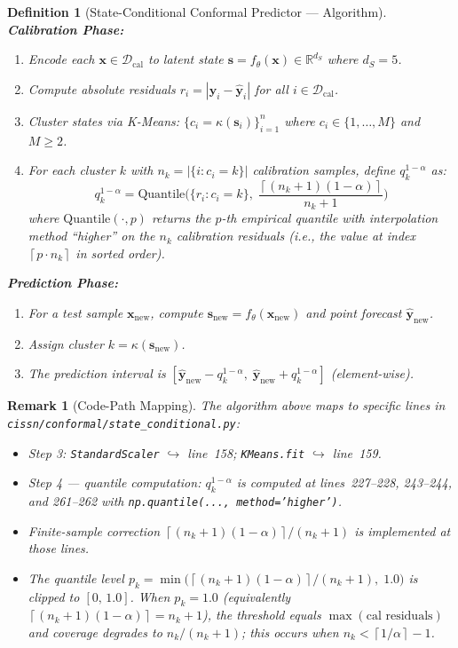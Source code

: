\documentclass[11pt]{article}
\newtheorem{definition}[theorem]{Definition}
\newtheorem{remark}[theorem]{Remark}
\newcommand{\R}{\mathbb{R}}
\newcommand{\cD}{\mathcal{D}}
\newcommand{\ceil}[1]{\left\lceil #1 \right\rceil}
\begin{document}
\begin{definition}[State-Conditional Conformal Predictor — Algorithm]\label{def:algo}
\textbf{Calibration Phase:}
\begin{enumerate}
    \item Encode each $\mathbf{x} \in \cD_{\text{cal}}$ to latent state $\mathbf{s} = f_\theta(\mathbf{x}) \in \R^{d_S}$ where $d_S = 5$.
    \item Compute absolute residuals $r_i = |\mathbf{y}_i - \hat{\mathbf{y}}_i|$ for all $i \in \cD_{\text{cal}}$.
    \item Cluster states via K-Means: $\{c_i = \kappa(\mathbf{s}_i)\}_{i=1}^{n}$ where $c_i \in \{1,\dots,M\}$ and $M \geq 2$.
    \item For each cluster $k$ with $n_k = |\{i \colon c_i = k\}|$ calibration samples, define $q_k^{1-\alpha}$ as:
    \[
    q_k^{1-\alpha} = \text{Quantile}\Big(\{r_i \colon c_i = k\},\; \frac{\ceil{(n_k+1)(1-\alpha)}}{n_k + 1}\Big)
    \]
    where $\text{Quantile}(\cdot, p)$ returns the $p$-th empirical quantile with interpolation method ``higher'' on the $n_k$ calibration residuals (i.e., the value at index $\ceil{p \cdot n_k}$ in sorted order).
\end{enumerate}

\textbf{Prediction Phase:}
\begin{enumerate}
    \item For a test sample $\mathbf{x}_{\text{new}}$, compute $\mathbf{s}_{\text{new}} = f_\theta(\mathbf{x}_{\text{new}})$ and point forecast $\hat{\mathbf{y}}_{\text{new}}$.
    \item Assign cluster $k = \kappa(\mathbf{s}_{\text{new}})$.
    \item The prediction interval is $[\hat{\mathbf{y}}_{\text{new}} - q_k^{1-\alpha},\; \hat{\mathbf{y}}_{\text{new}} + q_k^{1-\alpha}]$ (element-wise).
\end{enumerate}
\end{definition}

\begin{remark}[Code-Path Mapping]
The algorithm above maps to specific lines in \texttt{cissn/conformal/state\_conditional.py}:
\begin{itemize}
    \item Step 3: \texttt{StandardScaler} $\hookrightarrow$ line~158; \texttt{KMeans.fit} $\hookrightarrow$ line~159.
    \item Step 4 — quantile computation: $q_k^{1-\alpha}$ is computed at lines~227--228, 243--244, and 261--262 with \texttt{np.quantile(..., method='higher')}.
    \item Finite-sample correction $\ceil{(n_k+1)(1-\alpha)}/(n_k+1)$ is implemented at those lines.
    \item The quantile level $p_k = \min\big(\ceil{(n_k+1)(1-\alpha)}/(n_k+1),\; 1.0\big)$ is clipped to $[0,\,1.0]$. When $p_k = 1.0$ (equivalently $\ceil{(n_k+1)(1-\alpha)} = n_k+1$), the threshold equals $\max(\text{cal residuals})$ and coverage degrades to $n_k/(n_k+1)$; this occurs when $n_k < \ceil{1/\alpha} - 1$.
\end{itemize}
\end{remark}
\end{document}
